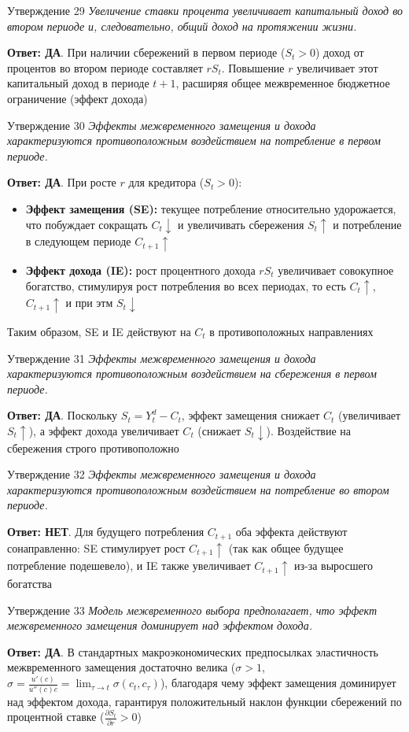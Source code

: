 \documentclass[10pt,a4paper]{article}
\newcommand{\qda}{\textbf{\color{yesgreen}Ответ: ДА}}
\newcommand{\qnet}{\textbf{\color{nored}Ответ: НЕТ}}
\newenvironment{answer}[2]{%
  \begin{qbox}{Утверждение #1}
  \textit{#2}\par\smallskip
}{%
  \end{qbox}\vspace{2pt}
}
\begin{document}
\begin{answer}{29}{Увеличение ставки процента увеличивает капитальный доход во втором периоде и, следовательно, общий доход на протяжении жизни.}
\qda. При наличии сбережений в первом периоде ($S_t > 0$) доход от процентов во втором периоде составляет $r S_t$. Повышение $r$ увеличивает этот капитальный доход в периоде $t+1$, расширяя общее межвременное бюджетное ограничение (эффект дохода)
\end{answer}

\begin{answer}{30}{Эффекты межвременного замещения и дохода характеризуются противоположным воздействием на потребление в первом периоде.}
\qda. При росте $r$ для кредитора ($S_t > 0$):
\begin{itemize}[leftmargin=1.5em]
  \item \textbf{Эффект замещения (SE):} текущее потребление относительно удорожается, что побуждает сокращать $C_t \downarrow$ и увеличивать сбережения $S_t \uparrow$ и  потребление в следующем периоде $C_{t+1} \uparrow$
  \item \textbf{Эффект дохода (IE):} рост процентного дохода $r S_t$ увеличивает совокупное богатство, стимулируя рост потребления во всех периодах, то есть $C_t \uparrow$, $C_{t+1} \uparrow$ и при этм $S_t \downarrow$
\end{itemize}
Таким образом, SE и IE действуют на $C_t$ в противоположных направлениях
\end{answer}

\begin{answer}{31}{Эффекты межвременного замещения и дохода характеризуются противоположным воздействием на сбережения в первом периоде.}
\qda. Поскольку $S_t = Y_t^d - C_t$, эффект замещения снижает $C_t$ (увеличивает $S_t \uparrow$), а эффект дохода увеличивает $C_t$ (снижает $S_t \downarrow$). Воздействие на сбережения строго противоположно
\end{answer}

\begin{answer}{32}{Эффекты межвременного замещения и дохода характеризуются противоположным воздействием на потребление во втором периоде.}
\qnet. Для будущего потребления $C_{t+1}$ оба эффекта действуют сонаправленно: SE стимулирует рост $C_{t+1} \uparrow$ (так как общее будущее потребление подешевело), и IE также увеличивает $C_{t+1} \uparrow$ из-за выросшего богатства
\end{answer}

\begin{answer}{33}{Модель межвременного выбора предполагает, что эффект межвременного замещения доминирует над эффектом дохода.}
\qda. В стандартных макроэкономических предпосылках эластичность межвременного замещения достаточно велика ($\sigma > 1$, $\sigma = \frac{u '(c)}{u''(c)c} = \lim_{\tau \to t} \sigma(c_t, c_{\tau})$), благодаря чему эффект замещения доминирует над эффектом дохода, гарантируя положительный наклон функции сбережений по процентной ставке ($\frac{\partial S_t}{\partial r} > 0$)
\end{answer}
\end{document}
